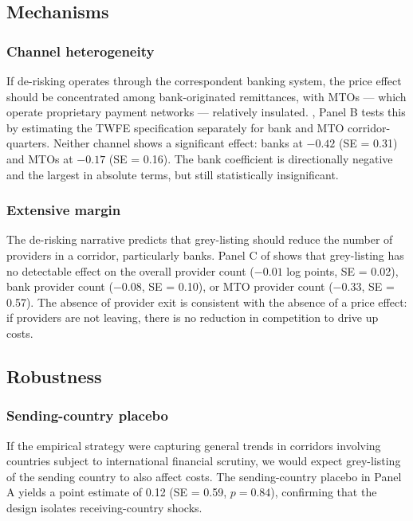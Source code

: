\documentclass[12pt]{article}
\begin{document}


\subsection{Mechanisms}

\subsubsection*{Channel heterogeneity} If de-risking operates through the correspondent banking system, the price effect should be concentrated among bank-originated remittances, with MTOs --- which operate proprietary payment networks --- relatively insulated. , Panel B tests this by estimating the TWFE specification separately for bank and MTO corridor-quarters. Neither channel shows a significant effect: banks at $-0.42$ (SE = 0.31) and MTOs at $-0.17$ (SE = 0.16). The bank coefficient is directionally negative and the largest in absolute terms, but still statistically insignificant.

\subsubsection*{Extensive margin} The de-risking narrative predicts that grey-listing should reduce the number of providers in a corridor, particularly banks. Panel C of  shows that grey-listing has no detectable effect on the overall provider count ($-0.01$ log points, SE = 0.02), bank provider count ($-0.08$, SE = 0.10), or MTO provider count ($-0.33$, SE = 0.57). The absence of provider exit is consistent with the absence of a price effect: if providers are not leaving, there is no reduction in competition to drive up costs.

\subsection{Robustness}



\subsubsection*{Sending-country placebo} If the empirical strategy were capturing general trends in corridors involving countries subject to international financial scrutiny, we would expect grey-listing of the sending country to also affect costs. The sending-country placebo in Panel A yields a point estimate of 0.12 (SE = 0.59, $p = 0.84$), confirming that the design isolates receiving-country shocks.
\end{document}
